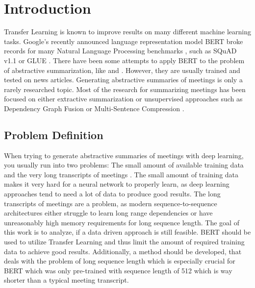 \chapter{Introduction}\label{ch:Introduction}


Transfer Learning is known to improve results on many different machine learning tasks.
Google's recently announced language representation model BERT broke records for many Natural Language Processing benchmarks \cite[p.~5--7]{devlin2018bert}, such as  SQuAD v1.1 \cite{rajpurkar-etal-2016-squad} or GLUE \cite{1804.07461}.
There have been some attempts to apply BERT to the problem of abstractive summarization, like \cite{1902.09243} and \cite{1908.08345}.
However, they are usually trained and tested on news articles.
Generating abstractive summaries of meetings is only a rarely researched topic.
Most of the research for summarizing meetings has been focused on either extractive summarization or unsupervised approaches such as Dependency Graph Fusion \cite{1609.07035} or Multi-Sentence Compression \cite{shang-etal-2018-unsupervised}.


\section{Problem Definition}

When trying to generate abstractive summaries of meetings with deep learning, you usually run into two problems: The small amount of available training data and the very long transcripts of meetings \cite[p.~650--651]{10.1007/978-3-030-20521-8_53}.
The small amount of training data makes it very hard for a neural network to properly learn, as deep learning approaches tend to need a lot of data to produce good results.
The long transcripts of meetings are a problem, as modern sequence-to-sequence architectures either struggle to learn long range dependencies \cite{Hochreiter01gradientflow} or have unreasonably high memory requirements for long sequence length.
The goal of this work is to analyze, if a data driven approach is still feasible.
BERT should be used to utilize Transfer Learning and thus limit the amount of required training data to achieve good results.
Additionally, a method should be developed, that deals with the problem of long sequence length which is especially crucial for BERT which was only pre-trained with sequence length of 512 \cite[p.~13]{devlin2018bert} which is way shorter than a typical meeting transcript.


